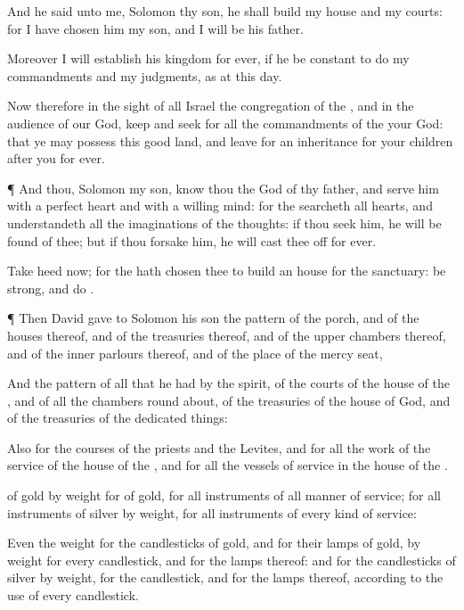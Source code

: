 {And he
said unto me,
Solomon thy
son, he shall
build my
house and my
courts: for I have
chosen him
{} my
son, and I will be his
father.

Moreover I will
establish his
kingdom for
ever, if he be
constant to
do my
commandments and my
judgments, as at this
day.

Now therefore in the
sight of all
Israel the
congregation of the
{}, and in the
audience of our
God,
keep and
seek for all the
commandments of the
{} your
God: that ye may
possess this
good
land, and leave
{} for an
inheritance for your
children
after you
for
ever.


\par }{\PP {}¶ And thou,
Solomon my
son,
know thou the
God of thy
father, and
serve him with a
perfect
heart and with a
willing
mind: for the
{}
searcheth all
hearts, and
understandeth all the
imaginations of the
thoughts: if thou
seek him, he will be
found of thee; but if thou
forsake him, he will cast thee
off for
ever.

Take
heed now; for the
{} hath
chosen thee to
build an
house for the
sanctuary: be
strong, and
do
{}.


\par }{\PP {}¶ Then
David
gave to
Solomon his
son the
pattern of the
porch, and of the
houses thereof, and of the
treasuries thereof, and of the upper
chambers thereof, and of the
inner
parlours thereof, and of the
place of the mercy
seat,

And the
pattern of all that he had by the
spirit, of the
courts of the
house of the
{}, and of all the
chambers round
about, of the
treasuries of the
house of
God, and of the
treasuries of the dedicated
things:

Also for the
courses of the
priests and the
Levites, and for all the
work of the
service of the
house of the
{}, and for all the
vessels of
service in the
house of the
{}.

 of
gold by
weight for
{} of
gold, for all
instruments of all manner of
service;
{} for all
instruments of
silver by
weight, for all
instruments of every kind of
service:

Even the
weight for the
candlesticks of
gold, and for their
lamps of
gold, by
weight for every
candlestick, and for the
lamps thereof: and for the
candlesticks of
silver by
weight,
{} for the
candlestick, and
{} for the
lamps thereof, according to the
use of every
candlestick.

}
